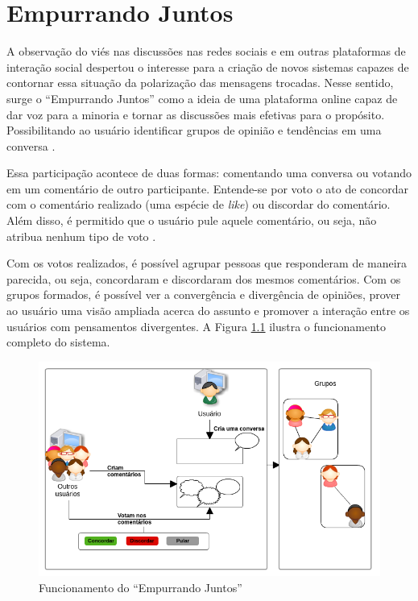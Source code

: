 \chapter{Empurrando Juntos} \label{cap:empurrandojuntos}

A observação do viés nas discussões nas redes sociais e em outras plataformas de interação social despertou o interesse
para a criação de novos sistemas capazes de contornar essa situação da polarização das mensagens trocadas.
Nesse sentido, surge o ``Empurrando Juntos'' como a ideia de uma plataforma online capaz 
de dar voz para a minoria e tornar as discussões mais efetivas para o propósito. Possibilitando ao usuário
identificar grupos de opinião e tendências em uma conversa \cite{empurrandojuntos}. 

Essa participação 
acontece de duas formas: comentando uma conversa ou votando em um comentário de outro participante. Entende-se por voto
o ato de concordar com o comentário realizado (uma espécie de \textit{like}) ou discordar do comentário. Além disso, é permitido
que o usuário pule aquele comentário, ou seja, não atribua nenhum tipo de voto \cite{empurrandojuntos}. 

Com os votos realizados, é possível agrupar pessoas que responderam de maneira parecida, ou seja, concordaram e
discordaram dos mesmos comentários. Com os grupos formados, é possível ver a convergência e divergência de opiniões, 
prover ao usuário uma visão ampliada acerca do assunto e promover a interação entre os usuários com 
pensamentos divergentes. A Figura \ref{fig:resumo_ej} ilustra o funcionamento completo do sistema.

\begin{figure}[h!]
\centering
\includegraphics[scale=0.6]{figuras/resumo_ej.png}
\caption{Funcionamento do ``Empurrando Juntos''}
\label{fig:resumo_ej}
\end{figure}



